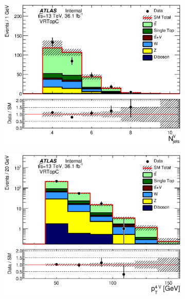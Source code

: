 \begin{figure}[h!]
\begin{subfigure}[b]{0.40\textwidth}
    \includegraphics[width=\textwidth]{figures/ttbar/postfit/CA_NjV_VRTopC}
               \caption{ }
    \end{subfigure}
    	\begin{subfigure}[b]{0.40\textwidth}  
	    \includegraphics[width=\textwidth]{figures/ttbar/postfit/CA_pTjV4_VRTopC_log}
               \caption{ }
    \end{subfigure}
    	\begin{subfigure}[b]{0.40\textwidth}  

\end{subfigure}
\end{figure}
